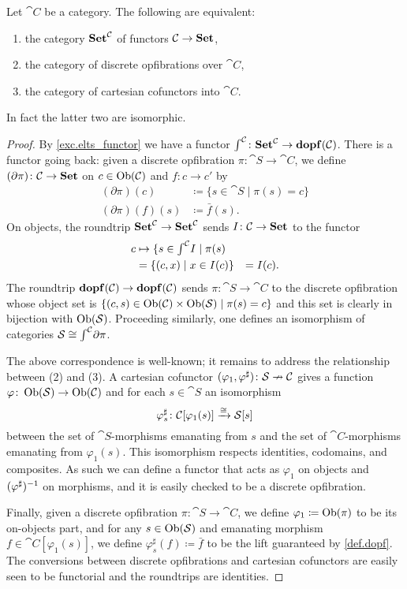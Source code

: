 \documentclass[Book-Poly]{subfiles}
\begin{document}
\begin{proposition}\label{prop.tfae_dopf}
Let $\cat{C}$ be a category. The following are equivalent:
\begin{enumerate}
	\item the category $\mathbf{Set}^{\mathcal{C}}$ of functors $\mathcal{C}\to\mathbf{Set}$,
	\item the category of discrete opfibrations over $\cat{C}$,
	\item the category of cartesian cofunctors into $\cat{C}$.
\end{enumerate}
In fact the latter two are isomorphic.
\end{proposition}
\begin{proof}
By \cref{exc.elts_functor} we have a functor $\textstyle{\int}^{\mathcal{C}}\colon\mathbf{Set}^{\mathcal{C}}\to\mathbf{dopf}(\mathcal{C})$. There is a functor going back: given a discrete opfibration $\pi\colon\cat{S}\to\cat{C}$, we define $(\partial\pi)\colon\mathcal{C}\to\mathbf{Set}$ on $c\in\operatorname{Ob}(\mathcal{C})$ and $f\colon c\to c'$ by 
\begin{align*}
	(\partial\pi)(c)&\coloneqq\{s\in\cat{S}\mid\pi(s)=c\}\\
	(\partial\pi)(f)(s)&\coloneqq\bar{f}(s).
\end{align*}
On objects, the roundtrip $\mathbf{Set}^{\mathcal{C}}\to\mathbf{Set}^{\mathcal{C}}$ sends $I\colon\mathcal{C}\to\mathbf{Set}$ to the functor
\begin{align*}
	c&
	\mapsto\{s\in\textstyle{\int}^{\mathcal{C}}I\mid \pi(s)\\&
	=\{(c,x)\mid x\in I(c)\}&=I(c).
\end{align*}
The roundtrip $\mathbf{dopf}(\mathcal{C})\to\mathbf{dopf}(\mathcal{C})$ sends $\pi\colon\cat{S}\to\cat{C}$ to the discrete opfibration whose object set is $\{(c,s)\in\operatorname{Ob}(\mathcal{C})\times\operatorname{Ob}(\mathcal{S})\mid\pi(s)=c\}$ and this set is clearly in bijection with $\operatorname{Ob}(\mathcal{S})$. Proceeding similarly, one defines an isomorphism of categories $\mathcal{S}\cong\textstyle{\int}^{\mathcal{C}}\partial\pi$.

The above correspondence is well-known; it remains to address the relationship between (2) and (3). A cartesian cofunctor $(\varphi_1,\varphi^\sharp)\colon\mathcal{S}\nrightarrow\mathcal{C}$ gives a function $\varphi\colon\operatorname{Ob}(\mathcal{S})\to\operatorname{Ob}(\mathcal{C})$ and for each $s\in\cat{S}$ an isomorphism
\[
  \varphi_s^\sharp\colon\mathcal{C}[\varphi_1(s)]\xrightarrow{\cong}\mathcal{S}[s]
\]
between the set of $\cat{S}$-morphisms emanating from $s$ and the set of $\cat{C}$-morphisms emanating from $\varphi_1(s)$. This isomorphism respects identities, codomains, and composites. As such we can define a functor that acts as $\varphi_1$ on objects and $(\varphi^\sharp)^{-1}$ on morphisms, and it is easily checked to be a discrete opfibration.

Finally, given a discrete opfibration $\pi\colon\cat{S}\to\cat{C}$, we define $\varphi_1\coloneqq\operatorname{Ob}(\pi)$ to be its on-objects part, and for any $s\in\operatorname{Ob}(\mathcal{S})$ and emanating morphism $f\in\cat{C}[\varphi_1(s)]$, we define $\varphi^\sharp_s(f)\coloneqq\bar{f}$ to be the lift guaranteed by \cref{def.dopf}. The conversions between discrete opfibrations and cartesian cofunctors are easily seen to be functorial and the roundtrips are identities.
\end{proof}
\end{document}
